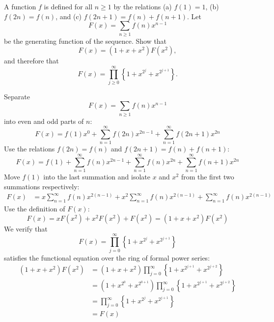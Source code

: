 \begin{exercise}
    A function $f$ is defined for all $n\geq 1$ by the relations (a) $f(1)=1$, (b) $f(2n) = f(n)$, and (c) $f(2n+1) = f(n) + f(n+1)$. Let
    \[
        F(x) = \sum_{n\geq 1}f(n) x^{n-1}
    \]
    be the generating function of the sequence. Show that
    \[
        F(x) = (1+x+x^2)F(x^2),  
    \]
    and therefore that 
    \[
        F(x) = \prod_{j\geq 0}^\infty \left\{1+x^{2^j} + x^{2^{j+1}}\right\}. 
    \]
\end{exercise}
\begin{solution}
    Separate 
    \[
        F(x) = \sum_{n\geq 1}f(n) x^{n-1}
    \]
    into even and odd parts of $n$:
        \[F(x) = f(1)x^0 + \sum_{n=1}^\infty f(2n)x^{2n - 1} + \sum_{n=1}^\infty f(2n+1) x^{2n}\]
    Use the relations $f(2n) = f(n)$ and $f(2n+1) = f(n) + f(n+1)$:
    \[
        F(x) = f(1) + \sum_{n=1}^\infty f(n) x^{2n-1} +\sum_{n=1}^\infty f(n) x^{2n} + \sum_{n=1}^\infty f(n+1) x^{2n}
    \]
    Move $f(1)$ into the last summation and isolate $x$ and $x^2$ from the first two summations respectively:
    \begin{align*}
        F(x) &= x\sum_{n=1}^\infty f(n) x^{2(n-1)} + x^2\sum_{n=1}^\infty f(n)x^{2(n-1)} + \sum_{n=1}^\infty f(n)x^{2(n-1)}
    \end{align*}
    Use the definition of $F(x)$:
    \[
        F(x) = xF(x^2) + x^2F(x^2) + F(x^2)= (1+x+x^2)F(x^2)   
    \]
    We verify that
    \[
        F(x) = \prod_{j=0}^\infty \left\{1+x^{2^j} + x^{2^{j+1}}\right\}
    \]
    satisfies the functional equation over the ring of formal power series:
    \begin{align*}
        (1+x+x^2)F(x^2) &= (1+x+x^2)\prod_{j=0}^\infty \left\{1+x^{2^{j+1}} + x^{2^{j+2}}\right\} \\
        &= (1+x^{2^0}+x^{2^{0+1}})\prod_{j=0}^\infty \left\{1+x^{2^{j+1}} + x^{2^{j+2}}\right\} \\
        &= \prod_{j=0}^\infty \left\{1+x^{2^j} + x^{2^{j+1}}\right\} \\
        &= F(x)
    \end{align*}
\end{solution}

